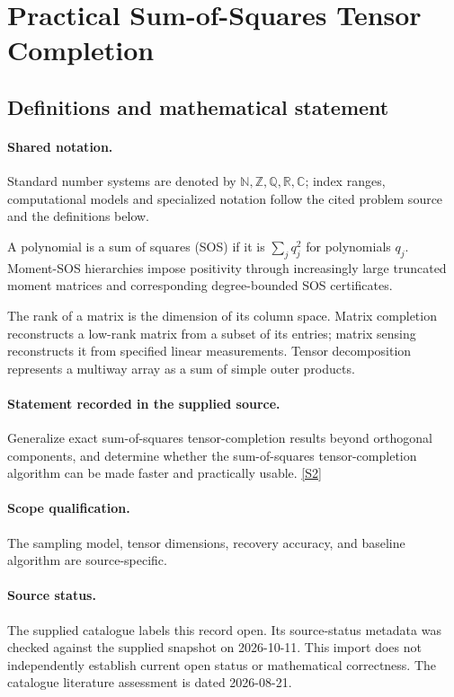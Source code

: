 \documentclass[11pt]{article}
\newcommand{\sref}[2]{\hyperlink{source:#1:#2}{[S#2]}}
\begin{document}
\section{Practical Sum-of-Squares Tensor Completion}\label{statement}

\subsection{Definitions and mathematical statement}

\paragraph{Shared notation.}Standard number systems are denoted by $\mathbb N,\mathbb Z,\mathbb Q,\mathbb R,\mathbb C$; index ranges, computational models and specialized notation follow the cited problem source and the definitions below.


A polynomial is a sum of squares (SOS) if it is $\sum_j q_j^2$ for polynomials $q_j$. Moment-SOS hierarchies impose positivity through increasingly large truncated moment matrices and corresponding degree-bounded SOS certificates.

The rank of a matrix is the dimension of its column space. Matrix completion reconstructs a low-rank matrix from a subset of its entries; matrix sensing reconstructs it from specified linear measurements. Tensor decomposition represents a multiway array as a sum of simple outer products.
\paragraph{Statement recorded in the supplied source.}
Generalize exact sum-of-squares tensor-completion results beyond orthogonal components, and determine whether the sum-of-squares tensor-completion algorithm can be made faster and practically usable. \sref{statement}{2}
\paragraph{Scope qualification.}
The sampling model, tensor dimensions, recovery accuracy, and baseline algorithm are source-specific.
\paragraph{Source status.}
The supplied catalogue labels this record open. Its source-status metadata was checked against the supplied snapshot on 2026-10-11. This import does not independently establish current open status or mathematical correctness. The catalogue literature assessment is dated 2026-08-21.
\end{document}
